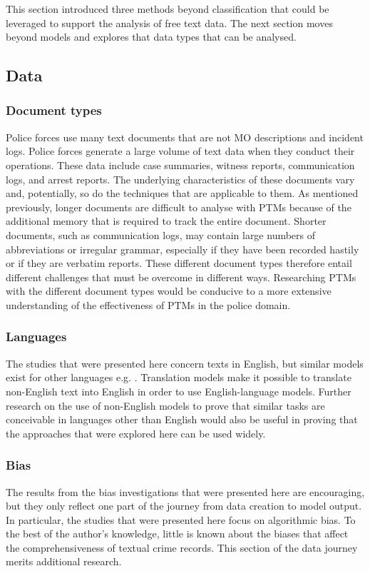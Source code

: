 This section introduced three methods beyond classification that could be leveraged to support the analysis of free text data. The next section moves beyond models and explores that data types that can be analysed.  


\subsection{Data}

\subsubsection{Document types} Police forces use many text documents that are not MO descriptions and incident logs. Police forces generate a large volume of text data when they conduct their operations. These data include case summaries, witness reports, communication logs, and arrest reports. The underlying characteristics of these documents vary and, potentially, so do the techniques that are applicable to them. As mentioned previously, longer documents are difficult to analyse with PTMs because of the additional memory that is required to track the entire document. Shorter documents, such as communication logs, may contain large numbers of abbreviations or irregular grammar, especially if they have been recorded hastily or if they are verbatim reports. These different document types therefore entail different challenges that must be overcome in different ways. Researching PTMs with the different document types would be conducive to a more extensive understanding of the effectiveness of PTMs in the police domain.

\subsubsection{Languages}The studies that were presented here concern texts in English, but similar models exist for other languages e.g. \parencite{scao2022bloom}. Translation models make it possible to translate non-English text into English in order to use English-language models. Further research on the use of non-English models to prove that similar tasks are conceivable in languages other than English would also be useful in proving that the approaches that were explored here can be used widely.


\subsubsection{Bias} The results from the bias investigations that were presented here are encouraging, but they only reflect one part of the journey from data creation to model output. In particular, the studies that were presented here focus on algorithmic bias. To the best of the author’s knowledge, little is known about the biases that affect the comprehensiveness of textual crime records. This section of the data journey merits additional research.

